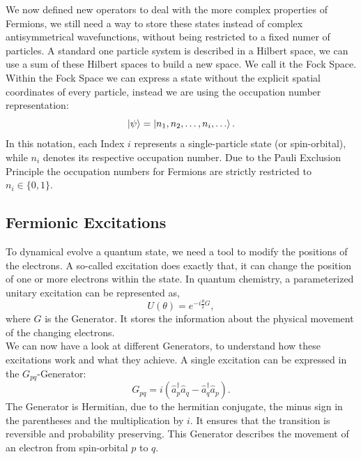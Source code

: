 We now defined new operators to deal with the more complex properties of Fermions, we still need a way to store these states instead of complex antisymmetrical wavefunctions, without being restricted to a fixed numer of particles.
A standard one particle system is described in a Hilbert space, we can use a sum of these Hilbert spaces to build a new space.
We call it the Fock Space.\\
Within the Fock Space we can express a state without the explicit spatial coordinates of every particle, instead we are using the occupation number representation:
\begin{equation}
    \ket{\psi} = \ket{n_1, n_2, \dots, n_i, \dots}.\label{eq:occupation_number_representation}
\end{equation}
In this notation, each Index $i$ represents a single-particle state (or spin-orbital), while $n_i$ denotes its respective occupation number.
Due to the Pauli Exclusion Principle the occupation numbers for Fermions are strictly restricted to $n_i \in \{0, 1\}$.

\cite[chapter 2.1]{schleich2025quantum}\cite[chapter 6.5]{benito_kottmann_qc_2025}\cite[chapter 7.7.1]{sakurai2020modern}
\cite[chapter III.B]{anand2022quantum}\cite[chapter II.E]{kottmann2020feasible}\cite[chapter 1.1, 5.3]{Kottmann2025}

\subsection{Fermionic Excitations}
To dynamical evolve a quantum state, we need a tool to modify the positions of the electrons.
A so-called excitation does exactly that, it can change the position of one or more electrons within the state.
In quantum chemistry, a parameterized unitary excitation can be represented as,
\begin{equation}
    U(\theta) = e^{-i \frac{\theta}{2} G},
\end{equation}
where $G$ is the Generator.
It stores the information about the physical movement of the changing electrons. \\
We can now have a look at different Generators, to understand how these excitations work and what they achieve.
A single excitation can be expressed in the $G_{pq}$-Generator:
\begin{equation}
    G_{pq} = i(\hat{a}^\dagger_p\hat{a}_q - \hat{a}^\dagger_q\hat{a}_p).
\end{equation}
The Generator is Hermitian, due to the hermitian conjugate, the minus sign in the parentheses and the multiplication by $i$.
It ensures that the transition is reversible and probability preserving.
This Generator describes the movement of an electron from spin-orbital $p$ to $q$. \\

